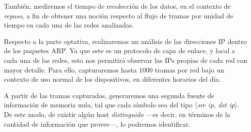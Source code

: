 También, mediremos el tiempo de recolección de los datos, en el contexto de \textit{reposo}, a fin de obtener una noción respecto al flujo de tramas por unidad de tiempo en cada una de las redes analizadas.

Respecto a la parte optativa, realizaremos un análisis de las direcciones IP dentro de los paquetes ARP. Ya que este es un protocolo de capa de enlace, y local a cada una de las redes, esto nos permitirá observar las IPs propias de cada red con mayor detalle. Para ello, capturaremos hasta $1000$ tramas por red bajo un contexto de uso normal de los dispositivos, en diferentes horarios del día. 

A partir de las tramas capturadas, generaremos una segunda fuente de información de memoria nula, tal que cada símbolo sea del tipo \textit{$\langle$src ip, dst ip$\rangle$}. De este modo, de existir algún host \textit{distinguido} ---es decir, en términos de la cantidad de información que provee---, lo podremos identificar.
